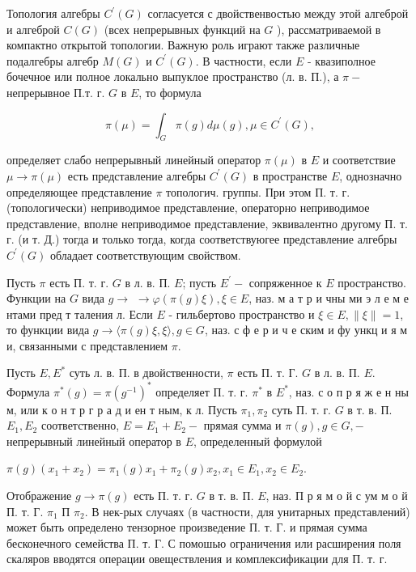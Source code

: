 \documentclass[10pt]{article}
\begin{document}
Топология алгебры $C^{\prime}(G)$ согласуется с двойственвостью между этой алгеброй и алгеброй $C(G)$ (всех непрерывных функций на $G$ ), рассматриваемой в компактно открытой топологии. Важную роль играют также различные подалгебры алгебр $M(G)$ и $C^{\prime}(G)$. В частности, если $E$ - квазиполное бочечное или полное локально выпуклое пространство (л. в. П.), а $\pi-$ непрерывное П.т. г. $G$ в $E$, то формула



\[

\pi(\mu)=\int_{G} \pi(g) d \mu(g), \mu \in C^{\prime}(G),

\]



определяет слабо непрерывный линейный оператор $\pi(\mu)$ в $E$ и соответствие $\mu \rightarrow \pi(\mu)$ есть представление алгебры $C^{\prime}(G)$ в пространстве $E$, однозначно определяющее представление $\pi$ топологич. группы. При этом П. т. г.(топологически) неприводимое представление, операторно неприводимое представление, вполне неприводимое представление, эквивалентно другому П. т. г. (и т. Д.) тогда и только тогда, когда соответствуюгее представление алгебры $C^{\prime}(G)$ обладает соответствующим свойством.



Пусть $\pi$ есть П. т. г. $G$ в л. в. П. $E$; пусть $E^{\prime}-$ сопряженное к $E$ пространство. Функции на $G$ вида $g \rightarrow$ $\rightarrow \varphi(\pi(g) \xi), \xi \in E$, наз. м а т р и чны ми э л е м е нтами пред т таления л. Если $E$ - гильбертово пространство и $\xi \in E,\|\xi\|=1$, то функции вида $g \rightarrow\langle\pi(g) \xi, \xi\rangle, g \in G$, наз. с ф е р и ч е ским и фу ункц и я м и, связанными с представлением $\pi$.



Пусть $E, E^{*}$ суть л. в. П. в двойственности, $\pi$ есть П. т. Г. $G$ в л. в. П. $E$. Формула $\pi^{*}(g)=\pi\left(g^{-1}\right)^{*}$ определяет П. т. г. $\pi^{*}$ в $E^{*}$, наз. с о п р я ж е н ны м, или к о н т р г р а д и ен т ным, к л. Пусть $\pi_{1}, \pi_{2}$ суть П. т. г. $G$ в т. в. П. $E_{1}, E_{2}$ соответственно, $E=E_{1}+E_{2}-$ прямая сумма и $\pi(g), g \in G,-$ непрерывный линейный оператор в $E$, определенный формулой



$\pi(g)\left(x_{1}+x_{2}\right)=\pi_{1}(g) x_{1}+\pi_{2}(g) x_{2}, x_{1} \in E_{1}, x_{2} \in E_{2}$.



Отображение $g \rightarrow \pi(g)$ есть П. т. г. $G$ в т. в. П. $E$, наз. П р я м о й с ум м о й П. т. Г. $\pi_{1}$ П $\pi_{2}$. В нек-рых случаях (в частности, для унитарных представлений) может быть определено тензорное произведение П. т. Г. и прямая сумма бесконечного семейства П. т. Г. С помошью ограничения или расширения поля скаляров вводятся операции овеществления и комплексификации для П. т. г.
\end{document}

